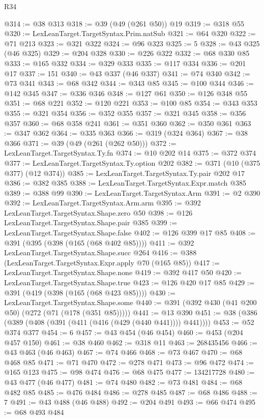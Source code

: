\begin{lexlean}{R34}
\begin{coremodule}
@314 := @38 @313
@318 := @39 (@49 (@261 @50)) @19
@319 := @318 @55
@320 := LexLeanTarget.TargetSyntax.Prim.natSub
@321 := @64 @320
@322 := @71 @213
@323 := @321 @322
@324 := @96 @323
@325 := 5
@328 := @43 @325 (@46 @325)
@329 := @204 @328
@330 := @226 @322
@332 := @68 @330 @85
@333 := @165 @332
@334 := @329 @333
@335 := @117 @334
@336 := @201 @17
@337 := 151
@340 := @43 @337 (@46 @337)
@341 := @74 @340
@342 := @73 @341
@343 := @68 @342
@344 := @343 @85
@345 := @100 @344
@346 := @142 @345
@347 := @336 @346
@348 := @127 @61
@350 := @126 @348 @55
@351 := @68 @221
@352 := @120 @221
@353 := @100 @85
@354 := @343 @353
@355 := @321 @354
@356 := @352 @355
@357 := @321 @345
@358 := @356 @357
@360 := @68 @358 @241
@361 := @351 @360
@362 := @350 @361
@363 := @347 @362
@364 := @335 @363
@366 := @319 (@324 @364)
@367 := @38 @366
@371 := @39 (@49 (@261 (@262 @50)))
@372 := LexLeanTarget.TargetSyntax.Ty.fn
@374 := @10 @202 @14
@375 := @372 @374
@377 := LexLeanTarget.TargetSyntax.Ty.option @202
@382 := @371 (@10 (@375 @377) (@12 @374))
@385 := LexLeanTarget.TargetSyntax.Ty.pair @202 @17
@386 := @382 @385
@388 := LexLeanTarget.TargetSyntax.Expr.match @385
@389 := @388 @99
@390 := LexLeanTarget.TargetSyntax.Arm
@391 := @2 @390
@392 := LexLeanTarget.TargetSyntax.Arm.arm
@395 := @392 LexLeanTarget.TargetSyntax.Shape.zero @50
@398 := @126 LexLeanTarget.TargetSyntax.Shape.pair @385
@399 := LexLeanTarget.TargetSyntax.Shape.false
@402 := @126 @399 @17 @85
@408 := @391 (@395 (@398 (@165 (@68 @402 @85))))
@411 := @392 LexLeanTarget.TargetSyntax.Shape.succ @264
@416 := @388 (LexLeanTarget.TargetSyntax.Expr.apply @70 (@165 @85))
@417 := LexLeanTarget.TargetSyntax.Shape.none
@419 := @392 @417 @50
@420 := LexLeanTarget.TargetSyntax.Shape.true
@423 := @126 @420 @17 @85
@429 := @391 (@419 (@398 (@165 (@68 @423 @85))))
@430 := LexLeanTarget.TargetSyntax.Shape.some
@440 := @391 (@392 @430 (@41 @200 @50) (@272 (@71 (@178 (@351 @85)))))
@441 := @13 @390
@451 := @38 (@386 (@389 (@408 (@391 (@411 (@416 (@429 (@440 @441)))) @441))))
@453 := @52 @374 @377
@454 := 6
@457 := @43 @454 (@46 @454)
@460 := @453 (@204 @457 @150)
@461 := @38 @460
@462 := @318 @11
@463 := 268435456
@466 := @43 @463 (@46 @463)
@467 := @74 @466
@468 := @73 @467
@470 := @68 @468 @85
@471 := @71 @470
@472 := @278 @471
@473 := @96 @472
@474 := @165 @123
@475 := @98 @474
@476 := @68 @475
@477 := 134217728
@480 := @43 @477 (@46 @477)
@481 := @74 @480
@482 := @73 @481
@484 := @68 @482 @85
@485 := @476 @484
@486 := @278 @485
@487 := @68 @486
@488 := 7
@491 := @43 @488 (@46 @488)
@492 := @204 @491
@493 := @66 @474
@495 := @68 @493 @484

\end{coremodule}
\end{lexlean}
